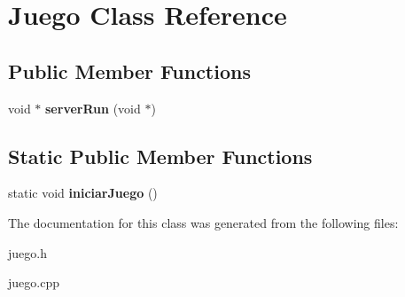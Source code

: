 \hypertarget{class_juego}{}\section{Juego Class Reference}
\label{class_juego}
\subsection*{Public Member Functions}
\begin{DoxyCompactItemize}
\item 
\mbox{\label{class_juego_a0a320fefb0fb796e407d1c80b694c884}} 
void $\ast$ {\bfseries server\+Run} (void $\ast$)
\end{DoxyCompactItemize}
\subsection*{Static Public Member Functions}
\begin{DoxyCompactItemize}
\item 
\mbox{\label{class_juego_aa6bc858522f9e9a6eedecb1fccdbdb39}} 
static void {\bfseries iniciar\+Juego} ()
\end{DoxyCompactItemize}


The documentation for this class was generated from the following files\+:\begin{DoxyCompactItemize}
\item 
juego.\+h\item 
juego.\+cpp\end{DoxyCompactItemize}
